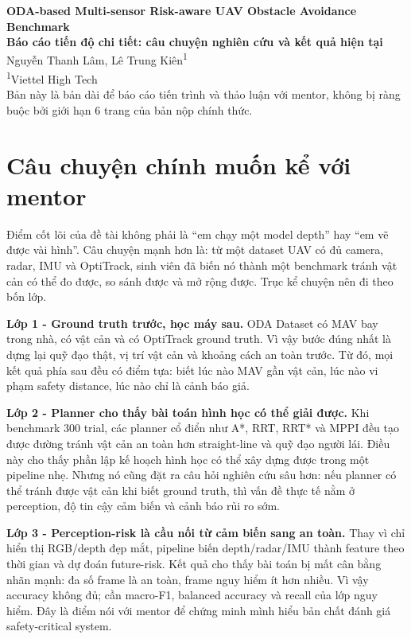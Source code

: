 \documentclass[10pt,a4paper]{article}
\newcommand{\TenDeTai}{ODA-based Multi-sensor Risk-aware UAV Obstacle Avoidance Benchmark}
\newcommand{\SinhVien}{Nguyễn Thanh Lâm}
\newcommand{\Mentor}{Lê Trung Kiên}
\newcommand{\DonViMentor}{Viettel High Tech}
\begin{document}
\begin{center}
{\Large\bfseries \TenDeTai}\\[3pt]
{\large\bfseries Báo cáo tiến độ chi tiết: câu chuyện nghiên cứu và kết quả hiện tại}\\[5pt]
{\normalsize \SinhVien, \Mentor\textsuperscript{1}}\\
{\small \textsuperscript{1}\DonViMentor}\\[4pt]
{\small Bản này là bản dài để báo cáo tiến trình và thảo luận với mentor, không bị ràng buộc bởi giới hạn 6 trang của bản nộp chính thức.}
\end{center}

\vspace{-1mm}
\tableofcontents
\vspace{2mm}

\section{Câu chuyện chính muốn kể với mentor}

Điểm cốt lõi của đề tài không phải là ``em chạy một model depth'' hay ``em vẽ được vài hình''. Câu chuyện mạnh hơn là: từ một dataset UAV có đủ camera, radar, IMU và OptiTrack, sinh viên đã biến nó thành một benchmark tránh vật cản có thể đo được, so sánh được và mở rộng được. Trục kể chuyện nên đi theo bốn lớp.

\textbf{Lớp 1 - Ground truth trước, học máy sau.}
ODA Dataset có MAV bay trong nhà, có vật cản và có OptiTrack ground truth. Vì vậy bước đúng nhất là dựng lại quỹ đạo thật, vị trí vật cản và khoảng cách an toàn trước. Từ đó, mọi kết quả phía sau đều có điểm tựa: biết lúc nào MAV gần vật cản, lúc nào vi phạm safety distance, lúc nào chỉ là cảnh báo giả.

\textbf{Lớp 2 - Planner cho thấy bài toán hình học có thể giải được.}
Khi benchmark 300 trial, các planner cổ điển như A*, RRT, RRT* và MPPI đều tạo được đường tránh vật cản an toàn hơn straight-line và quỹ đạo người lái. Điều này cho thấy phần lập kế hoạch hình học có thể xây dựng được trong một pipeline nhẹ. Nhưng nó cũng đặt ra câu hỏi nghiên cứu sâu hơn: nếu planner có thể tránh được vật cản khi biết ground truth, thì vấn đề thực tế nằm ở perception, độ tin cậy cảm biến và cảnh báo rủi ro sớm.

\textbf{Lớp 3 - Perception-risk là cầu nối từ cảm biến sang an toàn.}
Thay vì chỉ hiển thị RGB/depth đẹp mắt, pipeline biến depth/radar/IMU thành feature theo thời gian và dự đoán future-risk. Kết quả cho thấy bài toán bị mất cân bằng nhãn mạnh: đa số frame là an toàn, frame nguy hiểm ít hơn nhiều. Vì vậy accuracy không đủ; cần macro-F1, balanced accuracy và recall của lớp nguy hiểm. Đây là điểm nói với mentor để chứng minh mình hiểu bản chất đánh giá safety-critical system.
\end{document}
